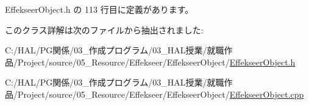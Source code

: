  Effekseer\+Object.\+h の 113 行目に定義があります。



このクラス詳解は次のファイルから抽出されました\+:\begin{DoxyCompactItemize}
\item 
C\+:/\+H\+A\+L/\+P\+G関係/03\+\_\+作成プログラム/03\+\_\+\+H\+A\+L授業/就職作品/\+Project/source/05\+\_\+\+Resource/\+Effekseer/\+Effekseer\+Object/\mbox{\hyperlink{_effekseer_object_8h}{Effekseer\+Object.\+h}}\item 
C\+:/\+H\+A\+L/\+P\+G関係/03\+\_\+作成プログラム/03\+\_\+\+H\+A\+L授業/就職作品/\+Project/source/05\+\_\+\+Resource/\+Effekseer/\+Effekseer\+Object/\mbox{\hyperlink{_effekseer_object_8cpp}{Effekseer\+Object.\+cpp}}\end{DoxyCompactItemize}
